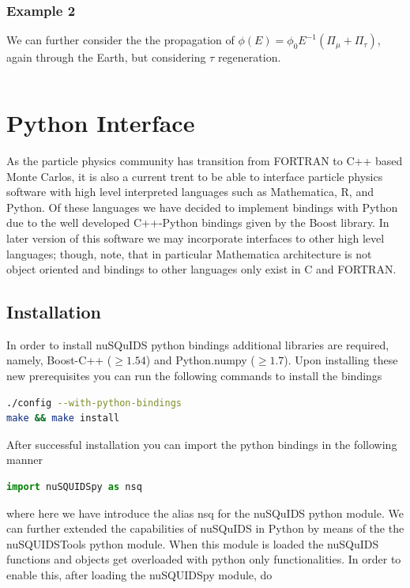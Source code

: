 \documentclass[3p,12pt]{elsarticle}
\begin{document}
\subsubsection{Example 2}

We can further consider the the propagation of $\phi(E) = \phi_0 E^{-1} ( \Pi_\mu + \Pi_\tau )$, again through the Earth, but considering $\tau$ regeneration. 

\begin{lstlisting}[frame=leftline, numbers = left,breaklines=true]

\end{lstlisting}

\section{Python Interface}

As the particle physics community has transition from {\ttfamily FORTRAN} to {\ttfamily C++} based Monte Carlos, it is also a current trent to be able to interface particle physics software with high level interpreted languages such as {\ttfamily Mathematica}, {\ttfamily R}, and {\ttfamily Python}. Of these languages we have decided to implement bindings with Python due to the well developed {\ttfamily C++}-{\ttfamily Python} bindings given by the {\ttfamily Boost} library. In later version of this software we may incorporate interfaces to other high level languages; though, note, that in particular {\ttfamily Mathematica} architecture is not object oriented and bindings to other languages only exist in {\ttfamily C} and {\ttfamily FORTRAN}.

\subsection{Installation}

In order to install nuSQuIDS python bindings additional libraries are required, namely, {\ttfamily Boost-C++} ($\ge1.54$) and {\ttfamily Python.numpy} ($\ge1.7$). Upon installing these new prerequisites you can run the following commands to install the bindings

\begin{lstlisting}[language=Bash]
./config --with-python-bindings
make && make install
\end{lstlisting}

After successful installation you can import the python bindings in the following manner

\begin{lstlisting}[language=Python]
import nuSQUIDSpy as nsq
\end{lstlisting}
where here we have introduce the alias {\ttfamily nsq} for the nuSQuIDS python module. We can further extended the
capabilities of nuSQuIDS in {\ttfamily Python} by means of the the {\ttfamily nuSQUIDSTools} python module. When 
this module is loaded the nuSQuIDS functions and objects get overloaded with python only functionalities. In order to enable this, after loading the {\ttfamily nuSQUIDSpy} module, do
\end{document}
